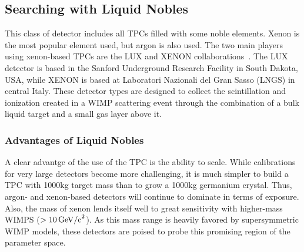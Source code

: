 \subsection{Searching with Liquid Nobles}

This class of detector includes all TPCs filled with some noble elements. Xenon is the most popular element used, but argon is also used. The two main players using xenon-based TPCs are the LUX and XENON collaborations~\cite{}. The LUX detector is based in the Sanford Underground Research Facility in South Dakota, USA, while XENON is based at Laboratori Nazionali del Gran Sasso (LNGS) in central Italy. These detector types are designed to collect the scintillation and ionization created in a WIMP scattering event through the combination of a bulk liquid target and a small gas layer above it.

\subsubsection{Advantages of Liquid Nobles}

A clear advantge of the use of the TPC is the ability to scale. While calibrations for very large detectors become more challenging, it is much simpler to build a TPC with 1000kg target mass than to grow a 1000kg germanium crystal. Thus, argon- and xenon-based detectors will continue to dominate in terms of exposure. Also, the mass of xenon lends itself well to great sensitivity with higher-mass WIMPS ($>10\, \mathrm{GeV/c}^2$). As this mass range is heavily favored by supersymmetric WIMP models, these detectors are poised to probe this promising region of the parameter space.